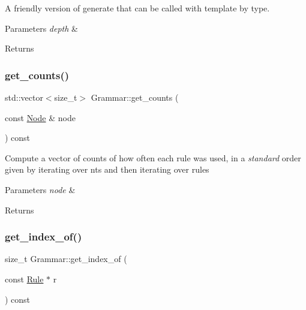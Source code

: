 A friendly version of generate that can be called with template by type. 
\begin{DoxyParams}{Parameters}
{\em depth} & \\
\hline
\end{DoxyParams}
\begin{DoxyReturn}{Returns}

\end{DoxyReturn}
\mbox{\label{class_grammar_ae0823f7af30a851a968dae46adbd49a5}} 
\subsubsection{\texorpdfstring{get\+\_\+counts()}{get\_counts()}}
{\footnotesize\ttfamily std\+::vector$<$size\+\_\+t$>$ Grammar\+::get\+\_\+counts (\begin{DoxyParamCaption}\item[{const \hyperlink{class_node}{Node} \&}]{node }\end{DoxyParamCaption}) const\hspace{0.3cm}{\ttfamily [inline]}}

Compute a vector of counts of how often each rule was used, in a {\itshape standard} order given by iterating over nts and then iterating over rules 
\begin{DoxyParams}{Parameters}
{\em node} & \\
\hline
\end{DoxyParams}
\begin{DoxyReturn}{Returns}

\end{DoxyReturn}
\mbox{\label{class_grammar_affec19f6e91201c8d29119bf50ffa3e6}} 
\subsubsection{\texorpdfstring{get\+\_\+index\+\_\+of()}{get\_index\_of()}}
{\footnotesize\ttfamily size\+\_\+t Grammar\+::get\+\_\+index\+\_\+of (\begin{DoxyParamCaption}\item[{const \hyperlink{class_rule}{Rule} $\ast$}]{r }\end{DoxyParamCaption}) const\hspace{0.3cm}{\ttfamily [inline]}}

